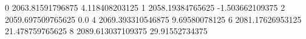 0 2063.81591796875 4.118408203125
1 2058.19384765625 -1.503662109375
2 2059.697509765625 0.0
4 2069.393310546875 9.69580078125
6 2081.17626953125 21.478759765625
8 2089.613037109375 29.91552734375
